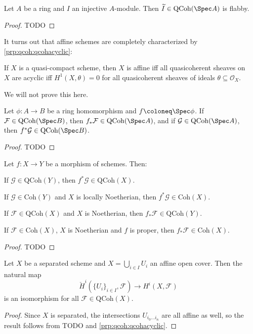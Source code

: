 \documentclass[wip, algebra]{bsteffan-lecturenotes}
\newcommand{\cO}{\mathcal{O}}
\newcommand{\cF}{\mathcal{F}}
\newcommand{\cG}{\mathcal{G}}
\newcommand{\QCoh}{\mathrm{QCoh}}
\newcommand{\Coh}{\mathrm{Coh}}
\begin{document}
\begin{proposition}
	Let $A$ be a ring and $I$ an injective $A$-module.
	Then $\widetilde{I} \in \QCoh(\Spec A)$ is flabby.
\end{proposition}
\begin{proof}
	TODO
\end{proof}
It turns out that affine schemes are completely characterized by \cref{prp:qcoh:qcohacyclic}:
\begin{theorem}[Serre]
	If $X$ is a quasi-compact scheme, then $X$ is affine iff all quasicoherent sheaves on $X$ are acyclic iff $H^1(X, \theta) = 0$ for all quasicoherent sheaves of ideals $\theta \subseteq \cO_X$.
\end{theorem}
We will not prove this here.
\begin{proposition}
	Let $\phi\colon A \to B$ be a ring homomorphism and $f \coloneq \Spec \phi$.
	If $\cF \in \QCoh(\Spec B)$, then $f_* \cF \in \QCoh(\Spec A)$, and if $\cG \in \QCoh(\Spec A)$, then $f^* \cG \in \QCoh(\Spec B)$.
\end{proposition}
\begin{proof}
	TODO
\end{proof}
\begin{proposition}
	Let $f\colon X \to Y$ be a morphism of schemes.
	Then:
	\begin{alphanumerate}
		\item If $\cG \in \QCoh(Y)$, then $f^* \cG \in \QCoh(X)$.
		\item If $\cG \in \Coh(Y)$ and $X$ is locally Noetherian, then $f^* \cG \in \Coh(X)$.
		\item If $\cF \in \QCoh(X)$ and $X$ is Noetherian, then $f_* \cF \in \QCoh(Y)$.
		\item If $\cF \in \Coh(X)$, $X$ is Noetherian and $f$ is proper, then $f_* \cF \in \Coh(X)$.
	\end{alphanumerate}
\end{proposition}
\begin{proof}
	TODO
\end{proof}
\begin{proposition}
	Let $X$ be a separated scheme and $X = \bigcup_{i \in I} U_i$ an affine open cover.
	Then the natural map
	\begin{equation*}
		\check{H}^i(\{U_i\}_{i \in I}, \cF) \to H^i(X, \cF)
	\end{equation*}
	is an isomorphism for all $\cF \in \QCoh(X)$.
\end{proposition}
\begin{proof}
	Since $X$ is separated, the intersections $U_{i_0 \ldots i_n}$ are all affine as well, so the result follows from TODO and \cref{prp:qcoh:qcohacyclic}.
\end{proof}
\end{document}
